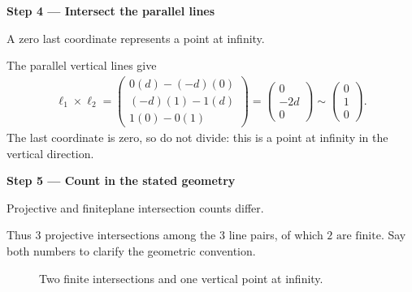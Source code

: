\documentclass[letterpaper,11pt,english,openany,oneside]{jupyterBook}
\begin{document}
\par

\par\medskip{}
{\color{QuizStepRed}\bfseries Step 4 — Intersect the parallel lines}\par\smallskip

\sphinxAtStartPar
{} A zero last coordinate represents a point at infinity.

\sphinxAtStartPar
The parallel vertical lines give
{\color{QuizMathBlue} \begin{equation*}
\begin{split}
\ell_1\times\ell_2=\begin{pmatrix}0(d)-(-d)(0)\\(-d)(1)-1(d)\\1(0)-0(1)\end{pmatrix}
=\begin{pmatrix}0\\-2d\\0\end{pmatrix}\sim\begin{pmatrix}0\\1\\0\end{pmatrix}.
\end{split}
\end{equation*}}
\sphinxAtStartPar
The last coordinate is zero, so do not divide: this is a point at infinity in the vertical direction.

\par

\par\medskip{}
{\color{QuizStepRed}\bfseries Step 5 — Count in the stated geometry}\par\smallskip

\sphinxAtStartPar
{} Projective and finite\sphinxhyphen{}plane intersection counts differ.

\sphinxAtStartPar
Thus {\color{QuizMathBlue} \(\boxed{3\text{ projective intersections}}\)} among the 3 line pairs, of which {\color{QuizMathBlue} \(\boxed{2\text{ are finite}}\)}. Say both numbers to clarify the geometric convention.

\par

\begin{figure}[H]
\centering
\capstart

\noindent{}
\caption{Two finite intersections and one vertical point at infinity.}\label{\detokenize{lectures/lecture02/quiz-workbook:id1}}\end{figure}
\end{document}
